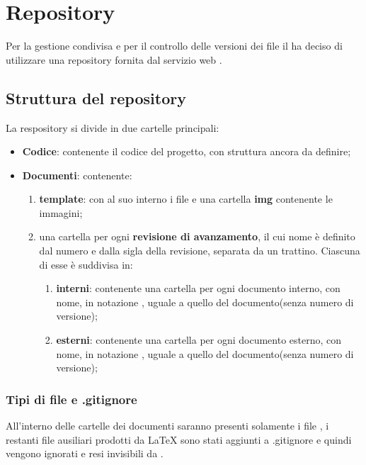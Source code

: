 \section{Repository}
Per la gestione condivisa e per il controllo delle versioni dei file il  ha deciso di utilizzare una repository fornita dal servizio web .
	\subsection{Struttura del repository}
	La respository si divide in due cartelle principali:
	\begin{itemize}
		\item \textbf{Codice}: contenente il codice del progetto, con struttura ancora da definire;
		\item \textbf{Documenti}: contenente:
		\begin{enumerate}
			\item \textbf{template}: con al suo interno i file  e una cartella \textbf{img} contenente le immagini;
			\item una cartella per ogni \textbf{revisione di avanzamento}, il cui nome è definito dal numero e dalla sigla della revisione, separata da un trattino. Ciascuna di esse è suddivisa in:
			\begin{enumerate}
				\item \textbf{interni}: contenente una cartella per ogni documento interno, con nome, in notazione , uguale a quello del documento(senza numero di versione);
				\item \textbf{esterni}: contenente una cartella per ogni documento esterno, con nome, in notazione , uguale a quello del documento(senza numero di versione);
			\end{enumerate}
		\end{enumerate}
	\end{itemize}
		\subsubsection{Tipi di file e .gitignore}
		All'interno delle cartelle dei documenti saranno presenti solamente i file , i restanti file ausiliari prodotti da \LaTeX{} sono stati aggiunti a .gitignore e quindi vengono ignorati e resi invisibili da .

